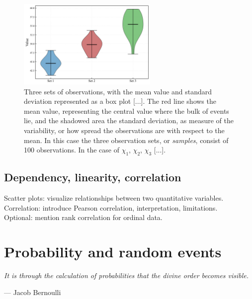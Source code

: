 \documentclass{book}
\begin{document}
\begin{figure}[ht]
    \centering
    \includegraphics[width=0.6\textwidth]{figures/chapter1/measurements_violin.png}
    \caption{Three sets of observations, with the mean value and standard deviation represented as a box plot [...]. The red line shows the mean value, representing the central value where the bulk of events lie, and the shadowed area the standard deviation, as measure of the variability, or how spread the observations are with respect to the mean. In this case the three observation sets, or \textit{samples}, consist of 100 observations. In the case of $\chi_1$, $\chi_2$, $\chi_3$ [...].}
    \label{fig:histogram1}
\end{figure}

\section{Dependency, linearity, correlation}

Scatter plots: visualize relationships between two quantitative variables.\\

Correlation: introduce Pearson correlation, interpretation, limitations.\\

Optional: mention rank correlation for ordinal data.\\



\chapter{Probability and random events}

\epigraph{\textit{It is through the calculation of probabilities that the divine order becomes visible.}}{— Jacob Bernoulli}
\end{document}
